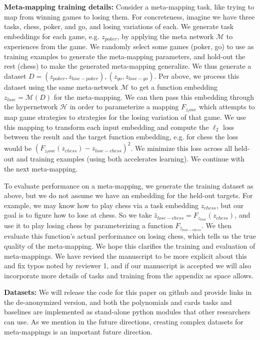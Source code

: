 \documentclass{article}
\begin{document}
\textbf{Meta-mapping training details:} Consider a meta-mapping task, like trying to map from winning games to losing them. For concreteness, imagine we have three tasks, chess, poker, and go, and losing variations of each. We generate task embeddings for each game, e.g. $z_{poker}$, by applying the meta network $\mathcal{M}$ to experiences from the game. We randomly select some games (poker, go) to use as training examples to generate the meta-mapping parameters, and hold-out the rest (chess) to make the generated meta-mapping generalize. We thus generate a dataset $D = {(z_{poker}, z_{lose-poker}), (z_{go}, z_{lose-go})}$. Per above, we process this dataset using the same meta-network $\mathcal{M}$ to get a function embedding $z_{lose} = \mathcal{M}(D)$ for the meta-mapping. We can then pass this embedding through the hypernetwork $\mathcal{H}$ in order to parameterize a mapping $F_{z_lose}$ which attempts to map game strategies to strategies for the losing variation of that game. We use this mapping to transform each input embedding and compute the $\ell_2$ loss between the result and the target function embedding, e.g. for chess the loss would be $(F_{z_lose}(z_{chess}) - z_{lose-chess})^2$. We minimize this loss across all held-out and training examples (using both accelerates learning). We continue with the next meta-mapping. \par
{}
To evaluate performance on a meta-mapping, we generate the training dataset as above, but we do not assume we have an embedding for the held-out targets. For example, we may know how to play chess via a task embedding $z_{chess}$, but our goal is to figure how to lose at chess. So we take $\hat{z}_{lose-chess} = F_{z_{lose}}(z_{chess})$, and use it to play losing chess by parameterizing a function $F_{\hat{z}_{lose-chess}}$. We then evaluate this function's actual performance on losing chess, which tells us the true quality of the meta-mapping. We hope this clarifies the training and evaluation of meta-mappings. We have revised the manuscript to be more explicit about this and fix typos noted by reviewer 1, and if our manuscript is accepted we will also incorporate more details of tasks and training from the appendix as space allows. \par
{}
\textbf{Datasets:} We will release the code for this paper on github and provide links in the de-anonymized version, and both the polynomials and cards tasks and baselines are implemented as stand-alone python modules that other researchers can use. As we mention in the future directions, creating complex datasets for meta-mappings is an important future direction. \par
\end{document}
